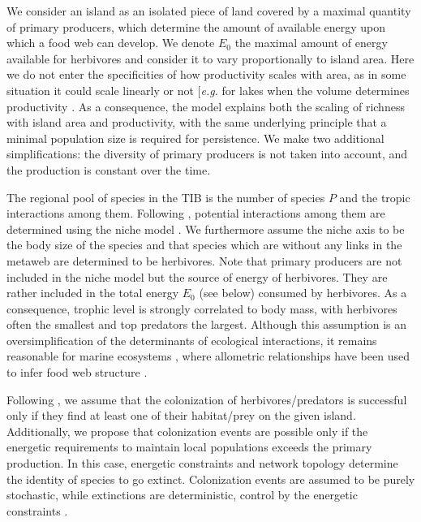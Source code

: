 We consider an island as an isolated piece of land covered by a maximal
quantity of primary producers, which determine the amount of available
energy upon which a food web can develop. We denote \(E_0\) the maximal
amount of energy available for herbivores and consider it to vary
proportionally to island area. Here we do not enter the specificities of
how productivity scales with area, as in some situation it could scale
linearly or not {[}\emph{e.g.} for lakes when the volume determines
productivity \citep{Post2000}. As a consequence, the model explains both
the scaling of richness with island area and productivity, with the same
underlying principle that a minimal population size is required for
persistence. We make two additional simplifications: the diversity of
primary producers is not taken into account, and the production is
constant over the time.

The regional pool of species in the TIB is the number of species \(P\)
and the tropic interactions among them. Following \citet{Cazelles2016a},
potential interactions among them are determined using the niche model
\citep{Williams2000}. We furthermore assume the niche axis to be the
body size of the species \citep{Gravel2013} and that species which are
without any links in the metaweb are determined to be herbivores. Note
that primary producers are not included in the niche model but the
source of energy of herbivores. They are rather included in the total
energy \(E_0\) (see below) consumed by herbivores. As a consequence,
trophic level is strongly correlated to body mass, with herbivores often
the smallest and top predators the largest. Although this assumption is
an oversimplification of the determinants of ecological interactions, it
remains reasonable for marine ecosystems \citep{Trebilco2013}, where
allometric relationships have been used to infer food web structure
\citep{Gravel2013}.

Following \citet{Gravel2011}, we assume that the colonization of
herbivores/predators is successful only if they find at least one of
their habitat/prey on the given island. Additionally, we propose that
colonization events are possible only if the energetic requirements to
maintain local populations exceeds the primary production. In this case,
energetic constraints and network topology determine the identity of
species to go extinct. Colonization events are assumed to be purely
stochastic, while extinctions are deterministic, control by the
energetic constraints \citep[this difference in stochastic nature
between these fundamental processes of biogeography has been recently
supported in][ where the authors show that extinction probability
decreases with the presence of resource/prey on the
island]{Cirtwill2015}.

